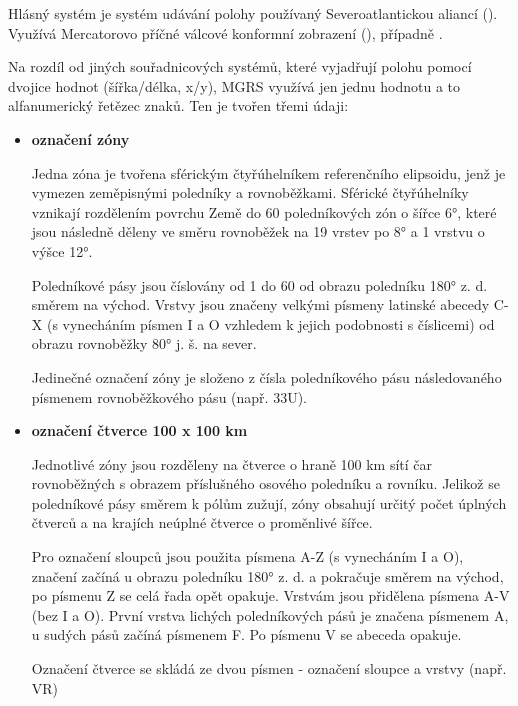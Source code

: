 Hlásný systém  je systém udávání polohy používaný
Severoatlantickou aliancí (). Využívá Mercatorovo příčné
válcové konformní zobrazení (), případně .

Na rozdíl od jiných souřadnicových systémů, které vyjadřují polohu
pomocí dvojice hodnot (šířka/délka, x/y), MGRS využívá jen jednu
hodnotu a to alfanumerický řetězec znaků. Ten je tvořen třemi údaji:

\begin{itemize}
	\item \textbf{označení zóny}
	
          Jedna zóna je tvořena sférickým čtyřúhelníkem referenčního
          elipsoidu, jenž je vymezen zeměpisnými poledníky a
          rovnoběžkami. Sférické čtyřúhelníky vznikají rozdělením
          povrchu Země do 60 poledníkových zón o šířce 6°, které jsou
          následně děleny ve směru rovnoběžek na 19 vrstev po 8° a 1
          vrstvu o výšce 12°.
	
          Poledníkové pásy jsou číslovány od 1 do 60 od obrazu
          poledníku 180° z. d. směrem na východ. Vrstvy jsou značeny
          velkými písmeny latinské abecedy C-X (s vynecháním písmen I
          a O vzhledem k jejich podobnosti s číslicemi) od obrazu
          rovnoběžky 80° j. š. na sever.
	
          Jedinečné označení zóny je složeno z čísla poledníkového
          pásu následovaného písmenem rovnoběžkového pásu (např. 33U).
	
	\item \textbf{označení čtverce 100 x 100 km}
	
          Jednotlivé zóny jsou rozděleny na čtverce o hraně 100 km
          sítí čar rovnoběžných s obrazem příslušného osového
          poledníku a rovníku. Jelikož se poledníkové pásy směrem k
          pólům zužují, zóny obsahují určitý počet úplných čtverců a
          na krajích neúplné čtverce o proměnlivé šířce.
	
          Pro označení sloupců jsou použita písmena A-Z (s vynecháním
          I a O), značení začíná u obrazu poledníku 180° z. d. a
          pokračuje směrem na východ, po písmenu Z se celá řada opět
          opakuje. Vrstvám jsou přidělena písmena A-V (bez I a
          O). První vrstva lichých poledníkových pásů je značena
          písmenem A, u sudých pásů začíná písmenem F. Po písmenu V se
          abeceda opakuje.
	
          Označení čtverce se skládá ze dvou písmen - označení sloupce
          a vrstvy (např. VR)
		

\end{itemize}
